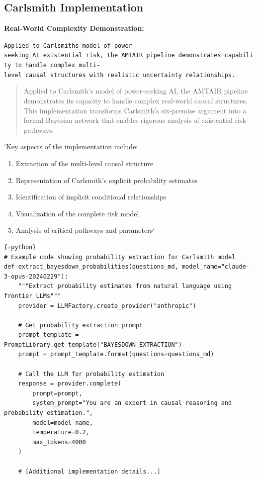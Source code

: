 \documentclass[
  11pt,
  letterpaper,
]{book}
\providecommand{\tightlist}{%
  \setlength{\itemsep}{0pt}\setlength{\parskip}{0pt}}
\begin{document}
\subsection{Carlsmith
Implementation}\label{sec-carlsmith-implementation}

\textbf{Real-World Complexity Demonstration:}

\texttt{Applied\ to\ Carlsmith\textquotesingle{}s\ model\ of\ power-seeking\ AI\ existential\ risk,\ the\ AMTAIR\ pipeline\ demonstrates\ capability\ to\ handle\ complex\ multi-level\ causal\ structures\ with\ realistic\ uncertainty\ relationships.}

\begin{quote}
Applied to Carlsmith's model of power-seeking AI, the AMTAIR pipeline
demonstrates its capacity to handle complex real-world causal
structures. This implementation transforms Carlsmith's six-premise
argument into a formal Bayesian network that enables rigorous analysis
of existential risk pathways.
\end{quote}

`Key aspects of the implementation include:

\begin{enumerate}
\def\labelenumi{\arabic{enumi}.}
\tightlist
\item
  Extraction of the multi-level causal structure
\item
  Representation of Carlsmith's explicit probability estimates
\item
  Identification of implicit conditional relationships
\item
  Visualization of the complete risk model
\item
  Analysis of critical pathways and parameters`
\end{enumerate}

\begin{verbatim}
{=python}
# Example code showing probability extraction for Carlsmith model
def extract_bayesdown_probabilities(questions_md, model_name="claude-3-opus-20240229"):
    """Extract probability estimates from natural language using frontier LLMs"""
    provider = LLMFactory.create_provider("anthropic")
    
    # Get probability extraction prompt
    prompt_template = PromptLibrary.get_template("BAYESDOWN_EXTRACTION")
    prompt = prompt_template.format(questions=questions_md)
    
    # Call the LLM for probability estimation
    response = provider.complete(
        prompt=prompt,
        system_prompt="You are an expert in causal reasoning and probability estimation.",
        model=model_name,
        temperature=0.2,
        max_tokens=4000
    )
    
    # [Additional implementation details...]
\end{verbatim}
\end{document}
